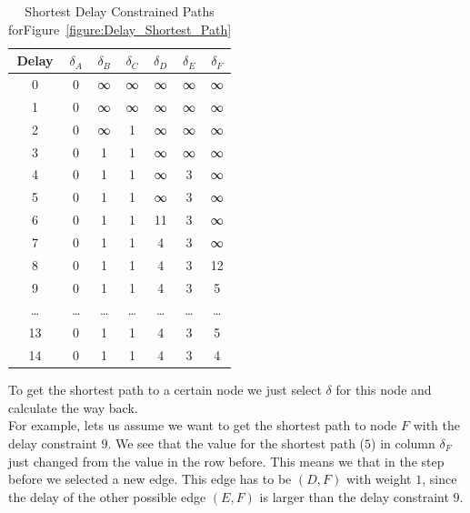 \documentclass[a4paper, 12pt]{report}
\begin{document}
\begin{table}[htbp]
    \caption{
        Shortest Delay Constrained Paths
        forFigure~\ref{figure:Delay_Shortest_Path}
    }
    \begin{center}
        \begin{tabular}{c|cccccc}
            Delay  &  $δ_A$ &  $δ_B$  &  $δ_C$  &  $δ_D$  &  $δ_E$  &  $δ_F$\\
            \hline
            0      &  0     &  ∞      &  ∞      &  ∞      &  ∞      &  ∞\\
            1      &  0     &  ∞      &  ∞      &  ∞      &  ∞      &  ∞\\
            2      &  0     &  ∞      &  1      &  ∞      &  ∞      &  ∞\\
            3      &  0     &  1      &  1      &  ∞      &  ∞      &  ∞\\
            4      &  0     &  1      &  1      &  ∞      &  3      &  ∞\\
            5      &  0     &  1      &  1      &  ∞      &  3      &  ∞\\
            6      &  0     &  1      &  1      &  11     &  3      &  ∞\\
            7      &  0     &  1      &  1      &  4      &  3      &  ∞\\
            8      &  0     &  1      &  1      &  4      &  3      &  12\\
            9      &  0     &  1      &  1      &  4      &  3      &  5\\
            …      &  …     &  …      &  …      &  …      &  …      &  …\\
            13     &  0     &  1      &  1      &  4      &  3      &  5\\
            14     &  0     &  1      &  1      &  4      &  3      &  4\\
        \end{tabular}
    \end{center}
    \label{table:Delay_Shortest_Path}
\end{table}

To get the shortest path to a certain node we just select $δ$ for this node and
calculate the way back.\\

For example, lets us assume we want to get the shortest path to node $F$ with
the delay constraint $9$. We see that the value for the shortest path ($5$) in
column $δ_F$ just changed from the value in the row before. This means we that
in the step before we selected a new edge. This edge has to be $(D,F)$ with
weight $1$, since the delay of the other possible edge $(E,F)$ is larger than
the delay constraint $9$.\\
\end{document}
